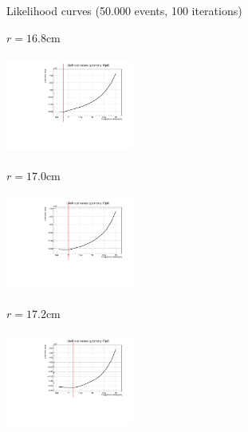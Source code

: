 \documentclass[8 pt]{beamer}
\begin{document}
\begin{frame}{Likelihood curves (50.000 events, 100 iterations)}
\justifying
\begin{minipage}[c]{.32\textwidth}
\begin{exampleblock}{} \begin{center}$r = 16.8$cm\end{center} \end{exampleblock}
\includegraphics[width=4.2cm, height=3.2cm]{figs/likelihood100HighStat/likelihood16p8.pdf} 
\end{minipage}
\begin{minipage}[c]{.32\textwidth}
\begin{exampleblock}{} \begin{center}$r = 17.0$cm\end{center} \end{exampleblock}
\includegraphics[width=4.2cm, height=3.2cm]{figs/likelihood100HighStat/likelihood17p0.pdf} 
\end{minipage}
\begin{minipage}[c]{.32\textwidth}
\begin{exampleblock}{} \begin{center}$r = 17.2$cm\end{center} \end{exampleblock}
\includegraphics[width=4.2cm, height=3.2cm]{figs/likelihood100HighStat/likelihood17p2.pdf} 
\end{minipage}


\end{frame}
\end{document}
